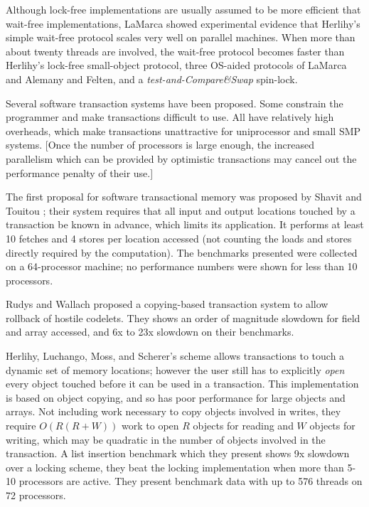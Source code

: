 \documentclass[preprint]{rdbacmconf}
\begin{document}
Although lock-free implementations are usually assumed to be more
efficient that wait-free implementations, LaMarca \cite{LaMarca94}
showed experimental evidence that Herlihy's simple
wait-free protocol scales very well on parallel machines.
When more than about twenty threads are involved, the wait-free
protocol becomes
faster than Herlihy's lock-free small-object protocol, three OS-aided
protocols of LaMarca and Alemany and Felten, and a
\emph{test-and-Compare\&Swap} spin-lock.



Several software transaction systems have been proposed.  Some constrain the
programmer and make transactions difficult to use.  All have
relatively high overheads, which make transactions unattractive for
uniprocessor and small SMP systems. [Once the number of processors is
large enough, the increased parallelism which can be provided by
optimistic transactions may cancel out the performance penalty of
their use.]

The first proposal for software transactional memory was proposed by
Shavit and Touitou \cite{ShavitTo95}; their system requires that all
input and output locations touched by a transaction be known in
advance, which limits its application.  It performs at least 10
fetches and 4 stores per location accessed (not counting the loads and
stores directly required by the computation).  The benchmarks
presented were collected on a 64-processor machine; no performance
numbers were shown for less than 10 processors.

Rudys and Wallach \cite{RudysWa02} proposed a copying-based
transaction system to allow rollback of hostile codelets.
They shows an order of magnitude slowdown for field and array
accessed, and 6x to 23x slowdown on their benchmarks.

Herlihy, Luchango, Moss, and Scherer's scheme \cite{HerlihyLuMoSc03}
allows transactions to touch a dynamic set of memory locations;
however the user still has to explicitly \emph{open} every object touched
before it can be used in a transaction.  This implementation is based
on object copying, and so has poor performance for large objects and
arrays.  Not including work necessary to copy objects involved in
writes, they require $O(R(R+W))$ work to open $R$ objects for reading
and $W$ objects for writing, which may be quadratic in the number of objects
involved in the transaction.   A list insertion benchmark which they
present shows 9x slowdown over a locking scheme, they beat the locking
implementation when more than 5-10 processors are active.  They
present benchmark data with up to 576 threads on 72 processors.
\end{document}

